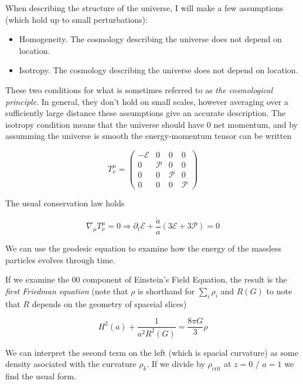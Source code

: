 When describing the structure of the universe, I will make a few assumptions (which hold up to small perturbations):

\begin{itemize}
    \item Homogeneity. The cosmology describing the universe does not depend on location.
    \item Isotropy. The cosmology describing the universe does not depend on location.
\end{itemize}

These two conditions for what is sometimes referred to as \textit{the cosmological principle}. 
In general, they don't hold on small scales, however averaging over a sufficiently large distance these assumptions give an accurate description. 
The isotropy condition means that the universe should have 0 net momentum, and by assumming the universe is smooth the energy-momentum tensor can be written

\begin{equation} T^\mu_\nu = \left(
\begin{array}{cccc}
    -\mathcal{E} & 0 & 0 & 0 \\
    0 & \mathcal{P} & 0 & 0 \\
    0 & 0 & \mathcal{P} & 0 \\
    0 & 0 & 0 & \mathcal{P}
\end{array}
\right)
\end{equation}

The usual conservation law holds

\begin{equation}
    \nabla_\mu T^{\mu}_{\nu} = 0 \Rightarrow \partial_t \mathcal{E} + \frac{\dot a}{a}(3\mathcal{E} + 3\mathcal{P}) = 0
\end{equation}

We can use the geodesic equation to examine how the energy of the massless particles evolves through time. 

If we examine the $00$ component of Einstein's Field Equation, the result is the \textit{first Friedman equation} (note that $\rho$ is shorthand for $\sum_i\rho_i$ and $R(G)$ to note that $R$ depends on the geometry of spaceial slices)

\begin{equation}
    H^2(a) + \frac{1}{a^2 R^2(G)} = \frac{8\pi G}{3}\rho
\end{equation}

We can interpret the second term on the left (which is spacial curvature) as some density asociated with the curvature $\rho_k$. If we divide by $\rho_{\text{crit}}$ at $z=0$ / $a=1$ we find the usual form. 

